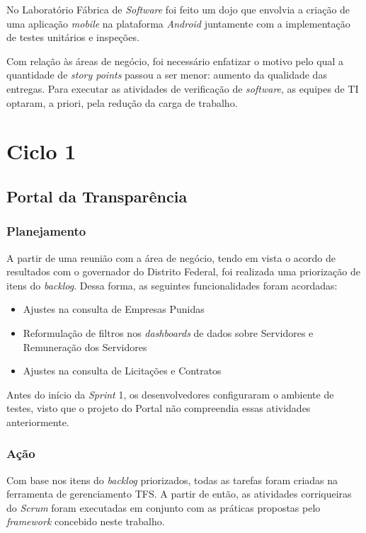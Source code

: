 No Laboratório Fábrica de \textit{Software} foi feito um dojo que envolvia a criação de uma aplicação \textit{mobile} na plataforma \textit{Android} juntamente com a implementação de testes unitários e inspeções.

Com relação às áreas de negócio, foi necessário enfatizar o motivo pelo qual a quantidade de \textit{story points} passou a ser menor: aumento da qualidade das entregas. Para executar as atividades de verificação de \textit{software}, as equipes de TI optaram, a priori, pela redução da carga de trabalho.

\section{Ciclo 1}

\subsection{Portal da Transparência}

\subsubsection{Planejamento}

A partir de uma reunião com a área de negócio, tendo em vista o acordo de resultados com o governador do Distrito Federal, foi realizada uma priorização de itens do \textit{backlog}. Dessa forma, as seguintes funcionalidades foram acordadas:

\begin{itemize}
	\item Ajustes na consulta de Empresas Punidas
	\item Reformulação de filtros nos \textit{dashboards} de dados sobre Servidores e Remuneração dos Servidores
	\item Ajustes na consulta de Licitações e Contratos
\end{itemize}

Antes do início da \textit{Sprint} 1, os desenvolvedores configuraram o ambiente de testes, visto que o projeto do Portal não compreendia essas atividades anteriormente.

\subsubsection{Ação}

Com base nos itens do \textit{backlog} priorizados, todas as tarefas foram criadas na ferramenta de gerenciamento TFS. A partir de então, as atividades corriqueiras do \textit{Scrum} foram executadas em conjunto com as práticas propostas pelo \textit{framework} concebido neste trabalho.

